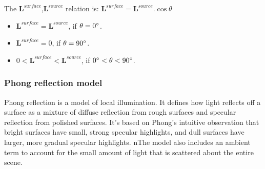 \documentclass{article}
\begin{document}
	The  $\pmb{L}^{surface}$,$ \pmb{L}^{source}$ relation is: $\pmb{L}^{surface} = \pmb{L}^{source}.\cos \theta $
	\begin{itemize}
		\item $\pmb{L}^{surface} = \pmb{L}^{source}$, if $\theta = 0\degree$.
		\item $\pmb{L}^{surface} = 0$, if $\theta = 90\degree$.
		\item $0 < \pmb{L}^{surface} < \pmb{L}^{source}$, if $0\degree < \theta  < 90\degree$.
	\end{itemize}
	
	\subsubsection{Phong reflection model }
	Phong reflection is a model of local illumination. It defines how light reflects off a surface as a mixture of diffuse reflection from rough surfaces and specular reflection from polished surfaces. It's based on Phong's intuitive observation that bright surfaces have small, strong specular highlights, and dull surfaces have larger, more gradual specular highlights. nThe model also includes an ambient term to account for the small amount of light that is scattered about the entire scene.
	\\
	
\end{document}
